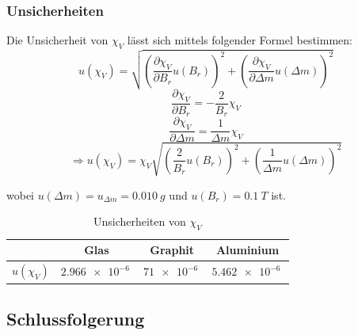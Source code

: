 \documentclass[
	a4paper,
	12pt,
	pagesize,
	ngerman
]{scrartcl}
\begin{document}
	\subsubsection*{Unsicherheiten}
	
	Die Unsicherheit von $\chi_V$ lässt sich mittels folgender Formel bestimmen:
	\begin{equation}
		u(\chi_V) = \sqrt{(\frac{\partial\chi_V}{\partial B_r}u(B_r))^2 + (\frac{\partial\chi_V}{\partial\Delta m}u(\Delta m))^2}
	\end{equation}
	\begin{equation}
		\frac{\partial\chi_V}{\partial B_r} =  -\frac{2}{B_r}\chi_V
	\end{equation}
	\begin{equation}
		\frac{\partial\chi_V}{\partial \Delta m} =  \frac{1}{\Delta m}\chi_V
	\end{equation}
	\begin{equation}
		\Rightarrow u(\chi_V) = \chi_V\sqrt{(\frac{2}{B_r}u(B_r))^2 + (\frac{1}{\Delta m}u(\Delta m))^2}
	\end{equation}
	
	wobei $u(\Delta m) =  u_{\Delta m} = \SI{0,010}{g}$ und $u(B_r) = \SI{0.1}{T}$ ist.
	
	\begin{table}[h]
		\centering
	\begin{tabular}{ r | c | c | c|}
		& Glas & Graphit & Aluminium \\ \hline
		$u(\chi_V) $ &$\SI{2,966  e-6}{}$&$\SI{71 e-6}{}$&$\SI{5,462 e-6}{}$\\ \hline
	\end{tabular}
	\caption{Unsicherheiten von $ \chi_V $}
	\end{table}
	\subsection{Schlussfolgerung}
	
\end{document}
